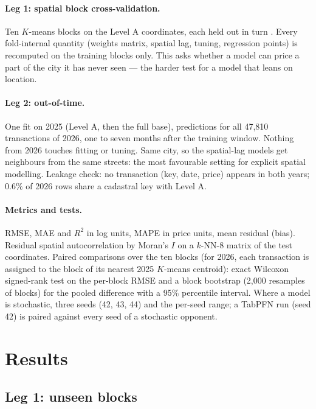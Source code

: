 \documentclass[11pt,a4paper]{article}
\begin{document}
\paragraph{Leg 1: spatial block cross-validation.} Ten $K$-means blocks on the Level A
coordinates, each held out in turn \citep{roberts2017,meyer2022}. Every fold-internal quantity
(weights matrix, spatial lag, tuning, regression points) is recomputed on the training blocks
only. This asks whether a model can price a part of the city it has never seen --- the harder
test for a model that leans on location.

\paragraph{Leg 2: out-of-time.} One fit on 2025 (Level A, then the full base), predictions for
all 47{,}810 transactions of 2026, one to seven months after the training window. Nothing from
2026 touches fitting or tuning. Same city, so the spatial-lag models get neighbours from the
same streets: the most favourable setting for explicit spatial modelling. Leakage check: no
transaction (key, date, price) appears in both years; $0.6\%$ of 2026 rows share a cadastral key
with Level A.

\paragraph{Metrics and tests.} RMSE, MAE and $R^2$ in log units, MAPE in price units, mean
residual (bias). Residual spatial autocorrelation by Moran's $I$ \citep{moran1950} on a $k$-NN-8
matrix of the test coordinates. Paired comparisons over the ten blocks (for 2026, each
transaction is assigned to the block of its nearest 2025 $K$-means centroid): exact Wilcoxon
signed-rank test on the per-block RMSE and a block bootstrap (2{,}000 resamples of blocks) for
the pooled difference with a 95\% percentile interval. Where a model is stochastic, three seeds
(42, 43, 44) and the per-seed range; a TabPFN run (seed 42) is paired against every seed of a
stochastic opponent.

\section{Results}
\label{sec:results}

\subsection{Leg 1: unseen blocks}
\end{document}
